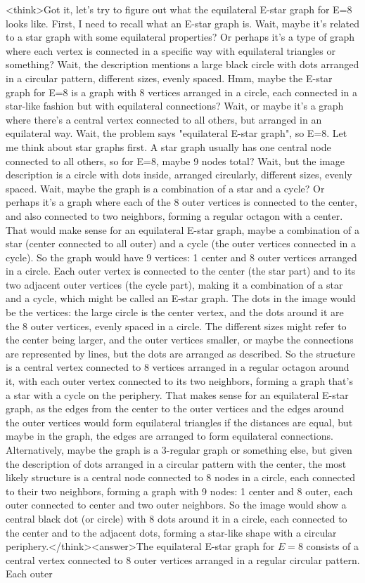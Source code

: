 <think>Got it, let's try to figure out what the equilateral E-star graph for E=8 looks like. First, I need to recall what an E-star graph is. Wait, maybe it's related to a star graph with some equilateral properties? Or perhaps it's a type of graph where each vertex is connected in a specific way with equilateral triangles or something? Wait, the description mentions a large black circle with dots arranged in a circular pattern, different sizes, evenly spaced. Hmm, maybe the E-star graph for E=8 is a graph with 8 vertices arranged in a circle, each connected in a star-like fashion but with equilateral connections? Wait, or maybe it's a graph where there's a central vertex connected to all others, but arranged in an equilateral way. Wait, the problem says "equilateral E-star graph", so E=8. Let me think about star graphs first. A star graph usually has one central node connected to all others, so for E=8, maybe 9 nodes total? Wait, but the image description is a circle with dots inside, arranged circularly, different sizes, evenly spaced. Wait, maybe the graph is a combination of a star and a cycle? Or perhaps it's a graph where each of the 8 outer vertices is connected to the center, and also connected to two neighbors, forming a regular octagon with a center. That would make sense for an equilateral E-star graph, maybe a combination of a star (center connected to all outer) and a cycle (the outer vertices connected in a cycle). So the graph would have 9 vertices: 1 center and 8 outer vertices arranged in a circle. Each outer vertex is connected to the center (the star part) and to its two adjacent outer vertices (the cycle part), making it a combination of a star and a cycle, which might be called an E-star graph. The dots in the image would be the vertices: the large circle is the center vertex, and the dots around it are the 8 outer vertices, evenly spaced in a circle. The different sizes might refer to the center being larger, and the outer vertices smaller, or maybe the connections are represented by lines, but the dots are arranged as described. So the structure is a central vertex connected to 8 vertices arranged in a regular octagon around it, with each outer vertex connected to its two neighbors, forming a graph that's a star with a cycle on the periphery. That makes sense for an equilateral E-star graph, as the edges from the center to the outer vertices and the edges around the outer vertices would form equilateral triangles if the distances are equal, but maybe in the graph, the edges are arranged to form equilateral connections. Alternatively, maybe the graph is a 3-regular graph or something else, but given the description of dots arranged in a circular pattern with the center, the most likely structure is a central node connected to 8 nodes in a circle, each connected to their two neighbors, forming a graph with 9 nodes: 1 center and 8 outer, each outer connected to center and two outer neighbors. So the image would show a central black dot (or circle) with 8 dots around it in a circle, each connected to the center and to the adjacent dots, forming a star-like shape with a circular periphery.</think><answer>The equilateral E-star graph for \( E = 8 \) consists of a central vertex connected to 8 outer vertices arranged in a regular circular pattern. Each outer 